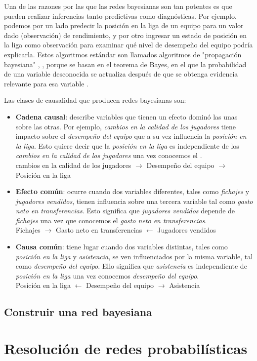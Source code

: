 Una de las razones por las que las redes bayesianas son tan potentes es que pueden realizar inferencias 
tanto predictivas como diagnósticas. Por ejemplo, podemos por un lado predecir la posición en la liga de un equipo para 
un valor dado (observación) de rendimiento, y por otro ingresar un estado de posición en la 
liga como observación para examinar qué nivel de desempeño del equipo podría explicarla. Estos algoritmos estándar son
llamados algoritmos de "propagación bayesiana" \cite{Cano2004}, \cite{more-algorithms}, \cite{back-prop} porque se basan en el teorema de Bayes, en el que la 
probabilidad de una variable desconocida se actualiza después de que se obtenga evidencia relevante para esa variable \cite{prop-alg}.

Las clases de causalidad que producen redes bayesianas son:
\begin{itemize}
    \item \textbf{Cadena causal}: describe variables que tienen un efecto dominó las unas sobre las otras. Por ejemplo, \textit{cambios en la calidad de 
    los jugadores} tiene impacto sobre el \textit{desempeño del equipo} que a su vez influencia la \textit{posición en la liga}. 
    Esto quiere decir que la \textit{posición en la liga} es independiente de los \textit{cambios en la calidad de los jugadores} una vez conocemos el .\\
    cambios en la calidad de los jugadores $\rightarrow$ Desempeño del equipo $\rightarrow$ Posición en la liga
    \item \textbf{Efecto común}: ocurre cuando dos variables diferentes, tales como \textit{fichajes} y \textit{jugadores vendidos}, tienen influencia sobre una tercera variable tal como 
    \textit{gasto neto en transferencias}. Esto significa que \textit{jugadores vendidos} depende de \textit{fichajes} una vez que conocemos el \textit{gasto neto en transferencias}.\\
    Fichajes $\rightarrow$ Gasto neto en transferencias $\leftarrow$ Jugadores vendidos    
    \item \textbf{Causa común}: tiene lugar cuando dos variables distintas, tales como \textit{posición en la liga} y \textit{asistencia}, se ven influenciados por la misma variable, tal 
    como \textit{desempeño del equipo}. Ello significa que \textit{asistencia} es independiente de \textit{posición en la liga} una vez conocemos \textit{desempeño del equipo}.\\
    Posición en la liga $\leftarrow$ Desempeño del equipo $\rightarrow$ Asistencia
\end{itemize}


\subsection{Construir una red bayesiana}


\section{Resolución de redes probabilísticas}


